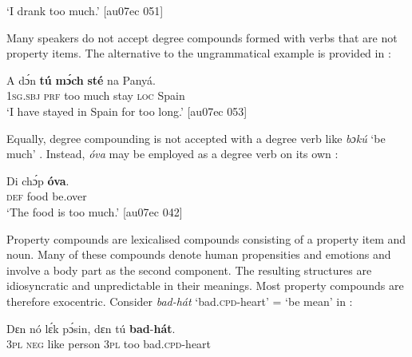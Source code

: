 \glt ‘I drank too much.’ [au07ec 051]
\z

Many speakers do not accept degree compounds formed with verbs that are not property items. The alternative to the ungrammatical example  is provided in : 

\z


\ea%
    \label{ex:key:130}
    \gll \MakeUppercase{A}   dɔ́n  \textbf{tú}  \textbf{mɔ́ch}  \textbf{sté}    na  Panyá.\\
\textsc{1sg.sbj}  \textsc{prf}  too  much  stay    \textsc{loc}  Spain\\

\glt ‘I have stayed in Spain for too long.’ [au07ec 053]
\z

Equally, degree compounding is not accepted with a degree verb like \textit{bɔkú} ‘be much’ . Instead, \textit{óva} may be employed as a degree verb on its own :


\z


\ea%
    \label{ex:key:132}
    \gll Di  chɔ́p  \textbf{óva}.\\
\textsc{def}  food    be.over\\

\glt ‘The food is too much.’ [au07ec 042]
\z

Property compounds are lexicalised compounds consisting of a property item and noun. Many of these compounds denote human propensities and emotions and involve a body part\index{} as the second component. The resulting structures are idiosyncratic and unpredictable in their meanings. Most property compounds are therefore exocentric. Consider \textit{bad-hát} ‘bad.\textsc{cpd}{}-heart’ = ‘be mean’ in :


\ea%
    \label{ex:key:133}
    \gll Dɛn  nó  lɛ́k  pɔ́sin,  dɛn  tú  \textbf{bad}-\textbf{hát}.\\
\textsc{3pl}  \textsc{neg}  like  person  \textsc{3pl}  too  bad.\textsc{cpd}{}-heart\\

